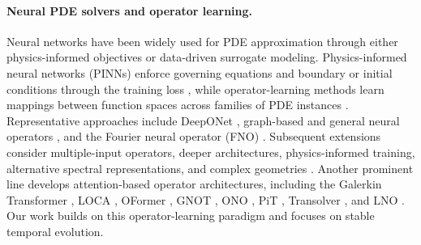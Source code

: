 \documentclass[11pt]{article}
\begin{document}
\paragraph{Neural PDE solvers and operator learning.} Neural networks have been widely used for PDE approximation through either physics-informed objectives or data-driven surrogate modeling. Physics-informed neural networks (PINNs) enforce governing equations and boundary or initial conditions through the training loss \citep{raissi2019physics, pang2019fpinns}, while operator-learning methods learn mappings between function spaces across families of PDE instances \citep{kovachki2023neural}. Representative approaches include DeepONet \citep{lu2021learning}, graph-based and general neural operators \citep{li2020neural,li2020multipole,kovachki2023neural}, and the Fourier neural operator (FNO) \citep{li2020fourier}. Subsequent extensions consider multiple-input operators, deeper architectures, physics-informed training, alternative spectral representations, and complex geometries \citep{jin2022mionet,rahman2023uno,li2024physics,gupta2021multiwavelet,li2023geo}. Another prominent line develops attention-based operator architectures, including the Galerkin Transformer \citep{cao2021choose}, LOCA \citep{kissas2022learning}, OFormer \citep{li2022transformer}, GNOT \citep{hao2023gnot}, ONO \citep{xiao2023improved}, PiT \citep{chen2024positional}, Transolver \citep{wu2024transolver}, and LNO \citep{wang2024latent}. Our work builds on this operator-learning paradigm and focuses on stable temporal evolution.
\end{document}
